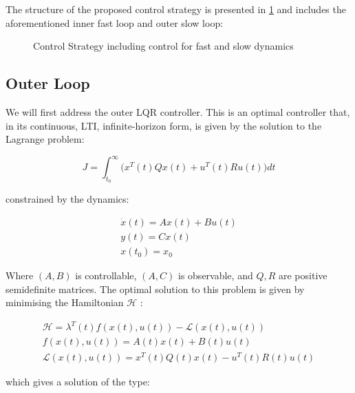 The structure of the proposed control strategy is presented in \cref{fig:tikzControlStrat} and includes the aforementioned inner fast loop and outer slow loop:  

\begin{figure}[h!]
	\centering
	\resizebox{\columnwidth}{!}{
	}
	\caption{Control Strategy including control for fast and slow dynamics}
	\label{fig:tikzControlStrat}
\end{figure}

\subsection{Outer Loop}\label{subsec:OuterLoop}

We will first address the outer LQR controller. This is an optimal controller that, in its continuous, LTI, infinite-horizon form, is given by the solution to the Lagrange problem:

\begin{equation}\label{eq:LagrangeProblem}
		J = \int_{t_0}^{\infty} \big(x^T(t)Qx(t) + u^T(t)Ru(t)\big)dt
\end{equation} 

constrained by the dynamics:

\begin{equation}\label{eq:LQRDynamicsConstraint}
	\begin{gathered}
		\dot{x}(t) = Ax(t) + Bu(t) \\
		y(t) = Cx(t) \\
		x(t_0) = x_0
	\end{gathered} 
\end{equation}

Where $(A,B)$ is controllable, $(A,C)$ is observable, and $Q,R$ are positive semidefinite matrices. The optimal solution to this problem is given by minimising the Hamiltonian $\mathcal{H}$ \cite{Liberzon2012}:

\begin{equation}\label{eq:Hamiltonian}
	\begin{gathered}
			\mathcal{H} = \lambda^T(t) f(x(t),u(t)) - \mathcal{L}(x(t),u(t)) \\
			f(x(t),u(t)) = A(t)x(t) + B(t)u(t) \\
			\mathcal{L}(x(t),u(t)) =  x^T(t)Q(t)x(t) - u^T(t)R(t)u(t)
	\end{gathered}
\end{equation}

which gives a solution of the type:

